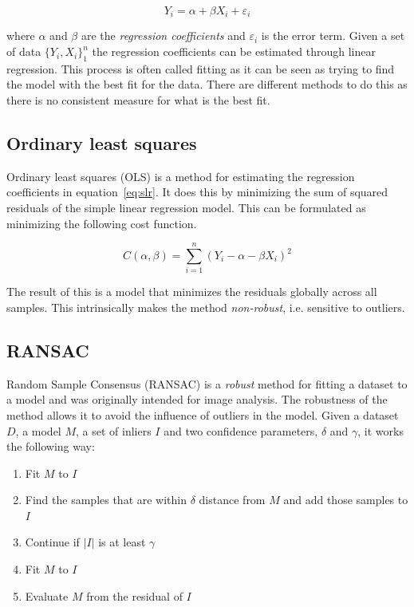 \documentclass[a4paper]{report}
\begin{document}
\begin{equation}
    Y_i = \alpha + \beta X_i + \varepsilon_i
    \label{eq:slr}
\end{equation}

where $\alpha$ and $\beta$ are the \emph{regression coefficients} and
$\varepsilon_i$ is the error term. Given a set of data
$\displaystyle \{Y_i, X_i\}_1^n$ the regression coefficients can be estimated
through linear regression. This process is often called fitting as it can be
seen as trying to find the model with the best fit for the data. There are
different methods to do this as there is no consistent measure for what is the
best fit.

\subsection{Ordinary least squares}
Ordinary least squares (OLS) is a method for estimating the regression
coefficients in equation~\ref{eq:slr}. It does this by minimizing the sum of
squared residuals of the simple linear regression model. This can be formulated
as minimizing the following cost function.

\begin{equation}
    C(\alpha, \beta) = \sum_{i=1}^n(Y_i - \alpha - \beta X_i)^2
\end{equation}

The result of this is a model that minimizes the residuals globally across all
samples. This intrinsically makes the method \emph{non-robust}, i.e. sensitive
to outliers.

\subsection{RANSAC}
\label{sec:ransac}

Random Sample Consensus (RANSAC) \citep{fischler81} is a \emph{robust} method
for fitting a dataset to a model and was originally intended for image
analysis. The robustness of the method allows it to avoid the influence of
outliers in the model. Given a dataset $D$, a model $M$, a set of inliers $I$
and two confidence parameters, $\delta$ and $\gamma$, it works the following
way:

\begin{enumerate}
    \item Fit $M$ to $I$
    \item Find the samples that are within $\delta$ distance from $M$ and add
        those samples to $I$
    \item Continue if $|I|$ is at least $\gamma$
    \item Fit $M$ to $I$
    \item Evaluate $M$ from the residual of $I$
\end{enumerate}
\end{document}
